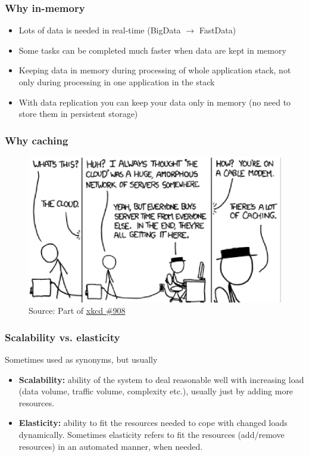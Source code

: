 \documentclass[10pt,utf8]{beamer}
\begin{document}
\begin{frame}
	\frametitle{Why in-memory}
	\begin{itemize}
	 \item Lots of data is needed in real-time (BigData $\rightarrow$ FastData)
	 \pause
	 \item Some tasks can be completed much faster when data are kept in memory
	 \pause
	 \item Keeping data in memory during processing of whole application stack, not only during processing in one application in the stack
	 \pause
	 \item With data replication you can keep your data only in memory (no need to store them in persistent storage)
	\end{itemize}
\end{frame}

\begin{frame}
	\frametitle{Why caching}
	\begin{figure}
		\centering
		\includegraphics[width=12cm]{./img/xkcd_908.eps}
		\caption{\tiny{Source: Part of \href{http://xkcd.com/908/}{xkcd \#908}}}
	\end{figure}
\end{frame}

\begin{frame}
	\frametitle{Scalability vs. elasticity}
	Sometimes used as synonyms, but usually
	\begin{itemize}
		\item \textbf{Scalability:} ability of the system to deal reasonable well with increasing load (data volume, traffic volume, complexity etc.), usually just by adding more resources.
		\item \textbf{Elasticity:} ability to fit the resources needed to cope with changed loads dynamically. Sometimes elasticity refers to fit the resources (add/remove resources) in an automated manner, when needed. 
	\end{itemize}
\end{frame}
\end{document}
